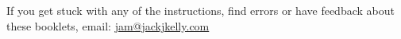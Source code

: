 If you get stuck with any of the instructions, find errors or have feedback about these booklets, email:
		\url{jam@jackjkelly.com}\label{email}